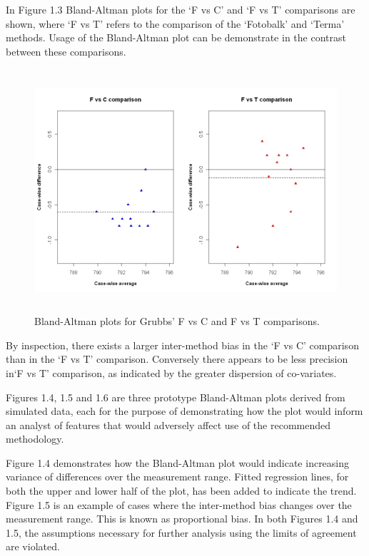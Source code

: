 \documentclass[12pt, a4paper]{report}
\begin{document}
	
	
	In Figure 1.3 Bland-Altman plots for the `F vs C' and `F vs T'
	comparisons are shown, where `F vs T' refers to the comparison of
	the `Fotobalk' and `Terma' methods. Usage of the Bland-Altman plot
	can be demonstrate in the contrast between these comparisons.
	
	\begin{figure}[h!]
		\begin{center}
			\includegraphics[height=90mm]{images/GrubbsDataTwoBAplots.jpeg}
			\caption{Bland-Altman plots for Grubbs' F vs C and F vs T comparisons.}\label{GrubbsDataTwoBAplots}
		\end{center}
	\end{figure}
	
	By inspection, there exists a larger inter-method bias in the `F
	vs C' comparison than in the `F vs T' comparison. Conversely there
	appears to be less precision in`F vs T' comparison, as indicated
	by the greater dispersion of co-variates.
	
	Figures 1.4, 1.5 and 1.6 are three prototype Bland-Altman plots
	derived from simulated data, each for the purpose of demonstrating
	how the plot would inform an analyst of features that would
	adversely affect use of the recommended methodology.
	
	Figure 1.4 demonstrates how the Bland-Altman plot would indicate
	increasing variance of differences over the measurement range.
	Fitted regression lines, for both the upper and lower half of the
	plot, has been added to indicate the trend. Figure 1.5 is an
	example of cases where the inter-method bias changes over the
	measurement range. This is known as proportional bias. In both
	Figures 1.4 and 1.5, the assumptions necessary for further
	analysis using the limits of agreement are violated.
	
\end{document}
